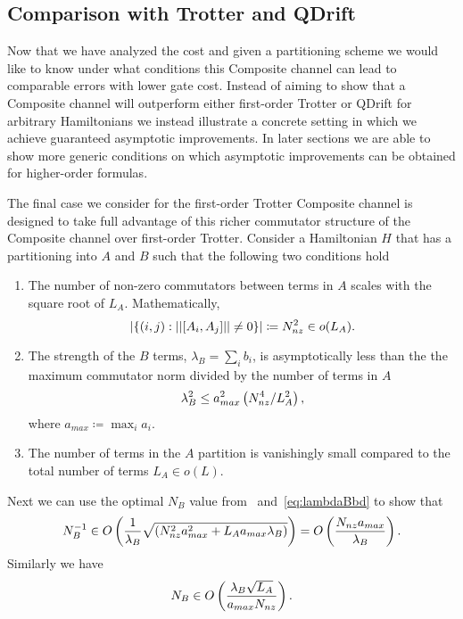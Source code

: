 \subsection{Comparison with Trotter and QDrift}\label{sec:first_order_improvements}
Now that we have analyzed the cost and given a partitioning scheme we would like to know under what conditions this Composite channel can lead to comparable errors with lower gate cost. Instead of aiming to show that a Composite channel will outperform either first-order
Trotter or QDrift for arbitrary Hamiltonians we instead illustrate a concrete setting in which we achieve guaranteed asymptotic improvements. In 
later sections we are able to show more generic conditions on which asymptotic improvements can be obtained for higher-order formulas. 

The final case we consider for the first-order Trotter Composite channel is designed to take full advantage of this richer commutator structure of the Composite channel over first-order Trotter. Consider a Hamiltonian $H$ that has a partitioning into $A$ and $B$ such that the following two conditions hold
\begin{enumerate}
    \item The number of non-zero commutators between terms in $A$ scales with the square root of $L_A$. Mathematically, 
    \begin{equation}
        \left|  \left\{ (i,j) : \left| \left|  [ A_i, A_j] \right| \right| \neq 0 \right\}  \right| \coloneqq N_{nz}^2 \in o(L_A).
    \end{equation}
    \item The strength of the $B$ terms, $\lambda_B = \sum_i b_i$, is asymptotically less than the the maximum commutator norm divided by the number of terms in $A$
    \begin{equation}\label{eq:lambdaBbd}
        \lambda_B^2 \leq a_{max}^2 \left( {N_{nz}^4}/L_A^2 \right),
    \end{equation}
    where $a_{max} \coloneqq \max_i a_i$.
    \item The number of terms in the $A$ partition is vanishingly small compared to the total number of terms $L_A \in o(L)$.
\end{enumerate}
Next we can use the optimal $N_B$ value from~ and~\eqref{eq:lambdaBbd} to show that
\begin{equation}
    N_B^{-1}\in O\left( \frac{1}{\lambda_B}\sqrt{\left( N_{nz}^2 a_{max}^2+ L_A a_{max} \lambda_B \right)}  \right)= O\left( \frac{N_{nz} a_{max}}{\lambda_B}  \right).
\end{equation}
Similarly we have
\begin{equation}
    N_B \in O\left(  \frac{\lambda_B\sqrt{L_A}}{a_{max} N_{nz} }  \right).
\end{equation}

